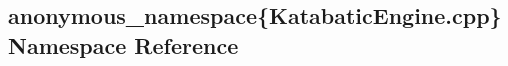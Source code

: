 \hypertarget{namespaceanonymous__namespace_02KatabaticEngine_8cpp_03}{}\subsection{anonymous\+\_\+namespace\{Katabatic\+Engine.\+cpp\} Namespace Reference}
\label{namespaceanonymous__namespace_02KatabaticEngine_8cpp_03}
